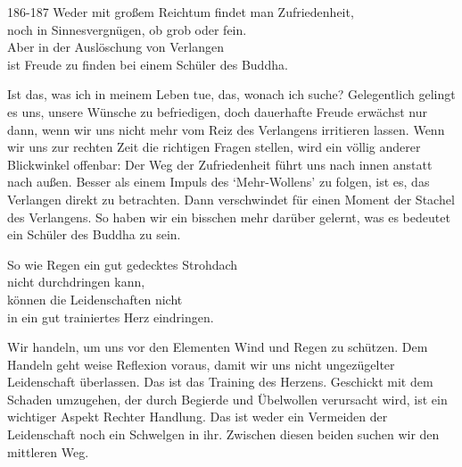 
\begin{dhpVerse}{186-187}
\label{dhp-186}\label{dhp-187}
Weder mit großem Reichtum findet man Zufriedenheit,\\ 
noch in Sinnesvergnügen, ob grob oder fein.\\ 
Aber in der Auslöschung von Verlangen\\ 
ist Freude zu finden bei einem Schüler des Buddha. 
\end{dhpVerse}

\begin{dhpRefl}

Ist das, was ich in meinem Leben tue, das, wonach ich suche? Gelegentlich
gelingt es uns, unsere Wünsche zu befriedigen, doch dauerhafte Freude erwächst
nur dann, wenn wir uns nicht mehr vom Reiz des Verlangens irritieren lassen.
Wenn wir uns zur rechten Zeit die richtigen Fragen stellen, wird ein völlig
anderer Blickwinkel offenbar: Der Weg der Zufriedenheit führt uns nach innen
anstatt nach außen. Besser als einem Impuls des `Mehr-Wollens' zu folgen, ist
es, das Verlangen direkt zu betrachten. Dann verschwindet für einen Moment der
Stachel des Verlangens. So haben wir ein bisschen mehr darüber gelernt, was es
bedeutet ein Schüler des Buddha zu sein.

\end{dhpRefl}


\begin{dhpVerse}{14}
\label{dhp-14}
So wie Regen ein gut gedecktes Strohdach\\ 
nicht durchdringen kann,\\ 
können die Leidenschaften nicht\\ 
in ein gut trainiertes Herz eindringen. 
\end{dhpVerse}

\begin{dhpRefl}

Wir handeln, um uns vor den Elementen Wind und Regen zu schützen. Dem Handeln
geht weise Reflexion voraus, damit wir uns nicht ungezügelter Leidenschaft
überlassen. Das ist das Training des Herzens. Geschickt mit dem Schaden
umzugehen, der durch Begierde und Übelwollen verursacht wird, ist ein
wichtiger Aspekt Rechter Handlung. Das ist weder ein Vermeiden der
Leidenschaft noch ein Schwelgen in ihr. Zwischen diesen beiden suchen wir den
mittleren Weg.

\end{dhpRefl}

